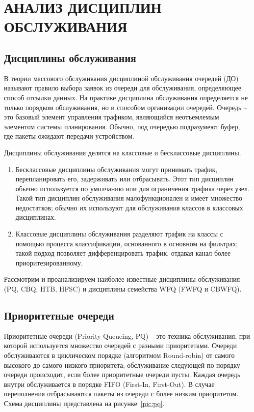 \section{АНАЛИЗ ДИСЦИПЛИН ОБСЛУЖИВАНИЯ}

    \subsection{Дисциплины обслуживания}

	В теории массового обслуживания дисциплиной обслуживания очередей (ДО)
	называют правило выбора заявок из очереди для обслуживания\cite{Aliev}, определяющее
	способ отсылки данных.  На практике дисциплина обслуживания определяется не
	только порядком обслуживания, но и способом организации очередей.  Очередь --
	это базовый элемент управления трафиком, являющийся неотъемлемым элементом
	системы планирования. Обычно, под очередью подразумеют буфер, где пакеты ожидают
	передачи устройством. \cite{trafficctl}

	Дисциплины обслуживания делятся на классовые и бесклассовые дисциплины.
	\begin{enumerate}
		\item Бесклассовые дисциплины обслуживания могут принимать трафик,
	перепланировать его, задерживать или отбрасывать. Этот тип дисциплин
	обычно используется по умолчанию или для ограничения трафика через узел.
	Такой тип дисциплин обслуживания малофункционален и имеет множество недостатков;
	обычно их используют для обслуживания классов в классовых дисциплинах.
		\item Классовые дисциплины обслуживания разделяют трафик на классы с помощью
	процесса классификации, основанного в основном на фильтрах; такой подход
	позволяет дифференцировать трафик, отдавая канал более приоритезированному.\cite{lartc}
	\end{enumerate}

	Рассмотрим и проанализируем наиболее известные дисциплины обслуживания
	(PQ, CBQ, HTB, HFSC) и дисциплины семейства WFQ (FWFQ и CBWFQ).

    \subsection{Приоритетные очереди}

    Приоритетные очереди (Priority Queueing, PQ) -- это техника обслуживания,
    при которой используется множество очередей с разными приоритетами. Очереди
    обслуживаются в циклическом порядке (алгоритмом Round-robin) от самого высокого 
    до самого низкого приоритета; обслуживание следующей по порядку очереди происходит,
    если более приоритетные очереди пусты. Каждая очередь внутри обслуживается в порядке FIFO
    (First-In, First-Out). В случае переполнения отбрасываются пакеты из очереди
    с более низким приоритетом.\cite{packethandling} Схема дисциплины представлена на рисунке~\ref{pic:pq}.
    
